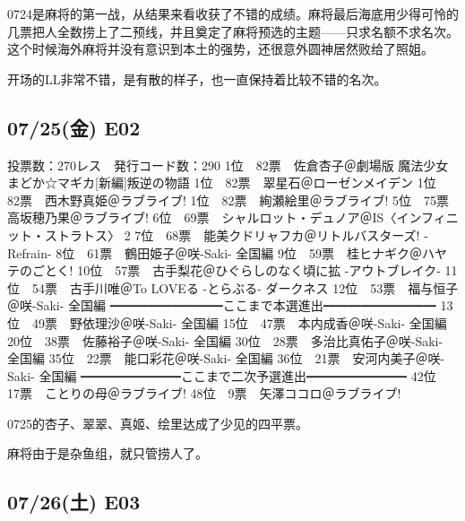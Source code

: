 0724是麻将的第一战，从结果来看收获了不错的成绩。麻将最后海底用少得可怜的几票把人全数捞上了二预线，并且奠定了麻将预选的主题——只求名额不求名次。这个时候海外麻将并没有意识到本土的强势，还很意外圆神居然败给了照姐。

开场的LL非常不错，是有散的样子，也一直保持着比较不错的名次。

\subsection{07/25(金) E02}

	投票数：270レス　発行コード数：290
	1位　82票　佐倉杏子＠劇場版 魔法少女まどか☆マギカ[新編]叛逆の物語
	1位　82票　翠星石＠ローゼンメイデン
	1位　82票　西木野真姫＠ラブライブ!
	1位　82票　絢瀬絵里＠ラブライブ!
	5位　75票　高坂穂乃果＠ラブライブ!
	6位　69票　シャルロット・デュノア＠IS〈インフィニット・ストラトス〉 2
	7位　68票　能美クドリャフカ＠リトルバスターズ! -Refrain-
	8位　61票　鶴田姫子＠咲-Saki- 全国編
	9位　59票　桂ヒナギク＠ハヤテのごとく!
	10位　57票　古手梨花＠ひぐらしのなく頃に拡 -アウトブレイク-
	11位　54票　古手川唯＠To LOVEる -とらぶる- ダークネス
	12位　53票　福与恒子＠咲-Saki- 全国編
	━━━━━━━━━ここまで本選進出━━━━━━━━━
	13位　49票　野依理沙＠咲-Saki- 全国編
	15位　47票　本内成香＠咲-Saki- 全国編
	20位　38票　佐藤裕子＠咲-Saki- 全国編
	30位　28票　多治比真佑子＠咲-Saki- 全国編
	35位　22票　能口彩花＠咲-Saki- 全国編
	36位　21票　安河内美子＠咲-Saki- 全国編
	━━━━━━━━ここまで二次予選進出━━━━━━━━
	42位　17票　ことりの母＠ラブライブ!
	48位　9票　矢澤ココロ＠ラブライブ!

0725的杏子、翠翠、真姬、绘里达成了少见的四平票。

麻将由于是杂鱼组，就只管捞人了。

\subsection{07/26(土) E03}


